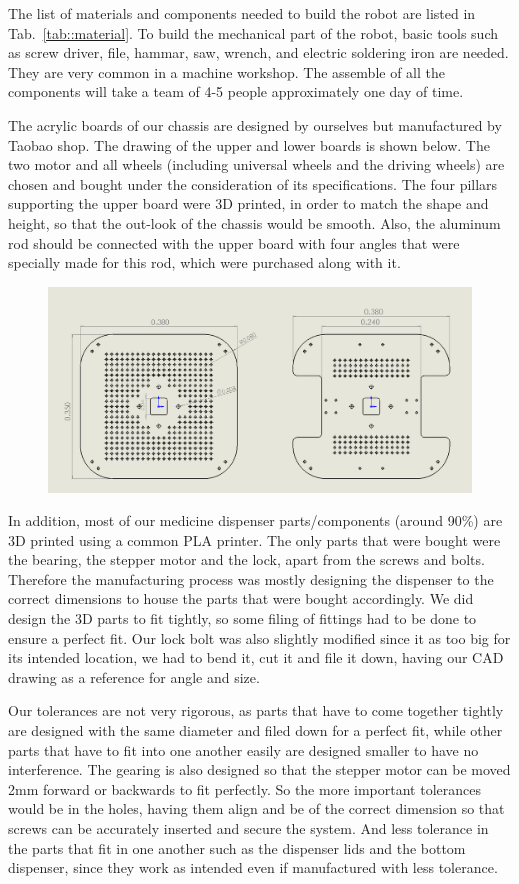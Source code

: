 \documentclass[12pt]{article}
\begin{document}
\par The list of materials and components needed to build the robot are listed in Tab.~\ref{tab::material}. To build the mechanical part of the robot, basic tools such as screw driver, file, hammar, saw, wrench, and electric soldering iron are needed. They are very common in a machine workshop. The assemble of all the components will take a team of 4-5 people approximately one day of time.
\par The acrylic boards of our chassis are designed by ourselves but manufactured by Taobao shop. The drawing of the upper and lower boards is shown below. The two motor and all wheels (including universal wheels and the driving wheels) are chosen and bought under the consideration of its specifications. The four pillars supporting the upper board were 3D printed, in order to match the shape and height, so that the out-look of the chassis would be smooth. Also, the aluminum rod should be connected with the upper board with four angles that were specially made for this rod, which were purchased along with it. 
\begin{figure}[H]
	\centering
	\includegraphics[width=0.7\linewidth]{Z4}
\end{figure}
\par In addition, most of our medicine dispenser parts/components (around 90\%) are 3D printed using a common PLA printer. The only parts that were bought were the bearing, the stepper motor and the lock, apart from the screws and bolts. Therefore the manufacturing process was mostly designing the dispenser to the correct dimensions to house the parts that were bought accordingly. We did design the 3D parts to fit tightly, so some filing of fittings had to be done to ensure a perfect fit. Our lock bolt was also slightly modified since it as too big for its intended location, we had to bend it, cut it and file it down, having our CAD drawing as a reference for angle and size.
\par Our tolerances are not very rigorous, as parts that have to come together tightly are designed with the same diameter and filed down for a perfect fit, while other parts that have to fit into one another easily are designed smaller to have no interference. The gearing is also designed so that the stepper motor can be moved 2mm forward or backwards to fit perfectly. So the more important tolerances would be in the holes, having them align and be of the correct dimension so that screws can be accurately inserted and secure the system. And less tolerance in the parts that fit in one another such as the dispenser lids and the bottom dispenser, since they work as intended even if manufactured with less tolerance.
\end{document}

